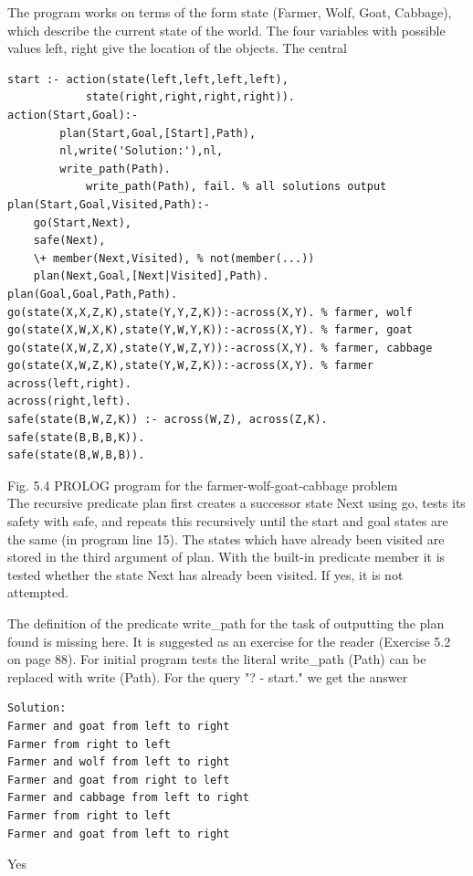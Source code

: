 \documentclass[10pt]{book}
\begin{document}
The program works on terms of the form state (Farmer, Wolf, Goat, Cabbage), which describe the current state of the world. The four variables with possible values left, right give the location of the objects. The central

\begin{verbatim}
start :- action(state(left,left,left,left),
            state(right,right,right,right)).
action(Start,Goal):-
        plan(Start,Goal,[Start],Path),
        nl,write('Solution:'),nl,
        write_path(Path).
            write_path(Path), fail. % all solutions output
plan(Start,Goal,Visited,Path):-
    go(Start,Next),
    safe(Next),
    \+ member(Next,Visited), % not(member(...))
    plan(Next,Goal,[Next|Visited],Path).
plan(Goal,Goal,Path,Path).
go(state(X,X,Z,K),state(Y,Y,Z,K)):-across(X,Y). % farmer, wolf
go(state(X,W,X,K),state(Y,W,Y,K)):-across(X,Y). % farmer, goat
go(state(X,W,Z,X),state(Y,W,Z,Y)):-across(X,Y). % farmer, cabbage
go(state(X,W,Z,K),state(Y,W,Z,K)):-across(X,Y). % farmer
across(left,right).
across(right,left).
safe(state(B,W,Z,K)) :- across(W,Z), across(Z,K).
safe(state(B,B,B,K)).
safe(state(B,W,B,B)).
\end{verbatim}

Fig. 5.4 PROLOG program for the farmer-wolf-goat-cabbage problem\\
The recursive predicate plan first creates a successor state Next using go, tests its safety with safe, and repeats this recursively until the start and goal states are the same (in program line 15). The states which have already been visited are stored in the third argument of plan. With the built-in predicate member it is tested whether the state Next has already been visited. If yes, it is not attempted.

The definition of the predicate write\_path for the task of outputting the plan found is missing here. It is suggested as an exercise for the reader (Exercise 5.2 on page 88). For initial program tests the literal write\_path (Path) can be replaced with write (Path). For the query "? - start." we get the answer

\begin{verbatim}
Solution:
Farmer and goat from left to right
Farmer from right to left
Farmer and wolf from left to right
Farmer and goat from right to left
Farmer and cabbage from left to right
Farmer from right to left
Farmer and goat from left to right
\end{verbatim}

Yes
\end{document}
